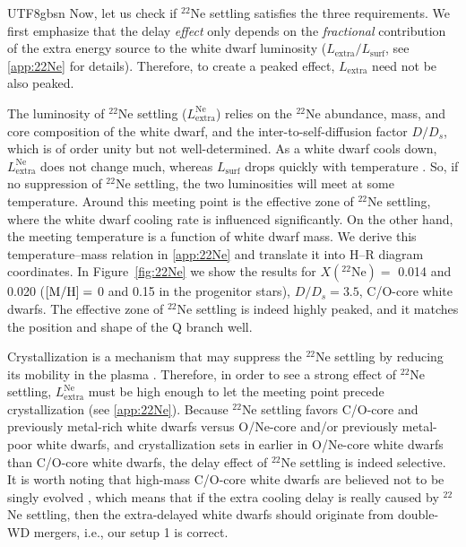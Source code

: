\documentclass[twocolumn, times, trackchanges]{aastex63_bren}
\begin{document}
\begin{CJK*}{UTF8}{gbsn}
Now, let us check if $^{22}$Ne settling satisfies the three requirements. We first emphasize that the delay \emph{effect} only depends on the \emph{fractional} contribution of the extra energy source to the white dwarf luminosity ($L_\text{extra}/L_\text{surf}$, see \ref{app:22Ne} for details). Therefore, to create a peaked effect, $L_\text{extra}$ need not be also peaked.

The luminosity of $^{22}$Ne settling ($L^\text{Ne}_\text{extra}$) relies on the $^{22}$Ne abundance, mass, and core composition of the white dwarf, and the inter-to-self-diffusion factor $D/D_s$, which is of order unity but not well-determined. As a white dwarf cools down, $L^\text{Ne}_\text{extra}$ does not change much, whereas $L_\text{surf}$ drops quickly with temperature \citep[e.g., Figure 2 of][]{Bildsten_2001}. So, if no suppression of $^{22}$Ne settling, the two luminosities will meet at some temperature. Around this meeting point is the effective zone of $^{22}$Ne settling, where the white dwarf cooling rate is influenced significantly. On the other hand, the meeting temperature is a function of white dwarf mass. We derive this temperature--mass relation in \ref{app:22Ne} and translate it into H--R diagram coordinates. In Figure~\ref{fig:22Ne} we show the results for $X(^{22}\text{Ne})=$ 0.014 and 0.020 ($\rm [M/H]=$ 0 and 0.15 in the progenitor stars), $D/D_s=3.5$, C/O-core white dwarfs. The effective zone of $^{22}$Ne settling is indeed highly peaked, and it matches the position and shape of the Q branch well.

Crystallization is a mechanism that may suppress the $^{22}$Ne settling by reducing its mobility in the plasma \citep[e.g.,][]{Bildsten_2001, Deloye_2002}. Therefore, in order to see a strong effect of $^{22}$Ne settling, $L^\text{Ne}_\text{extra}$ must be high enough to let the meeting point precede crystallization (see \ref{app:22Ne}). Because $^{22}$Ne settling favors C/O-core and previously metal-rich white dwarfs versus O/Ne-core and/or previously metal-poor white dwarfs, and crystallization sets in earlier in O/Ne-core white dwarfs than C/O-core white dwarfs, the delay effect of $^{22}$Ne settling is indeed selective. It is worth noting that high-mass C/O-core white dwarfs are believed not to be singly evolved \citep[e.g.,][]{Siess_2007, Lauffer_2018}, which means that if the extra cooling delay is really caused by $^{22}$Ne settling, then the extra-delayed white dwarfs should originate from double-WD mergers, i.e., our setup 1 is correct.


\end{CJK*}
\end{document}
